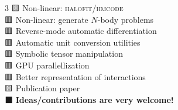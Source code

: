 \documentclass[25pt, a0paper, portrait]{tikzposter}
\newcommand{\emoji}[1]{{\emojifont #1}}
\begin{document}
\begin{columns}
{\begin{multicols}{3}
    \emoji{🟨} Non-linear: \textsc{halofit}/\textsc{hmcode} \\
    \emoji{🟥} Non-linear: generate $N$-body problems \\
    \emoji{🟥} Reverse-mode automatic differentiation \\
    \emoji{🟥} Automatic unit conversion utilities \\
    \emoji{🟥} Symbolic tensor manipulation \\
    \emoji{🟥} GPU parallellization \\
    \emoji{🟥} Better representation of interactions \\
    \emoji{🟨} Publication paper \\
    \emoji{⬛} \textbf{Ideas/contributions are very welcome!}
    \end{multicols}
}
\fi



\end{columns}
\end{document}
